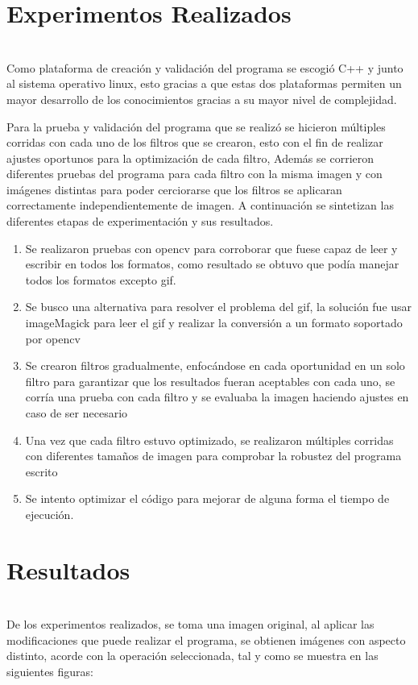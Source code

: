 \documentclass[11pt]{article}
\begin{document}
\section{Experimentos Realizados}\\

    Como plataforma de creación y validación del programa se escogió C++ y junto al sistema operativo linux, esto gracias a que estas dos plataformas permiten un mayor desarrollo de los conocimientos gracias a su mayor nivel de complejidad.
    
	Para la prueba y validación del programa que se realizó se hicieron múltiples corridas con cada uno de los filtros que se crearon, esto con el fin de realizar ajustes oportunos para la optimización de cada filtro, Además se corrieron diferentes pruebas del programa para cada filtro con la misma imagen y con imágenes distintas para poder cerciorarse que los filtros se aplicaran correctamente independientemente de imagen.
	A continuación se sintetizan las diferentes etapas de experimentación y sus resultados.
	\begin{enumerate}
	    \item Se realizaron pruebas con opencv para corroborar que fuese capaz de leer y escribir en todos los formatos, como resultado se obtuvo que podía manejar todos los formatos excepto gif.
		\item Se busco una alternativa para resolver el problema del gif, la solución fue usar imageMagick para leer el gif y realizar la conversión a un formato soportado por opencv
		\item Se crearon filtros gradualmente, enfocándose en cada oportunidad en un solo filtro para garantizar que los resultados fueran aceptables con cada uno, se corría una prueba con cada filtro y se evaluaba la imagen haciendo ajustes en caso de ser necesario
		\item Una vez que cada filtro estuvo optimizado, se realizaron múltiples corridas con diferentes tamaños de imagen para comprobar la robustez del programa escrito
		\item Se intento optimizar el código para mejorar de alguna forma el tiempo de ejecución.
	\end{enumerate} 

\newpage
\section{Resultados}\\

De los experimentos realizados, se toma una imagen original, al aplicar las modificaciones que puede realizar el programa, se obtienen imágenes con aspecto distinto, acorde con la operación seleccionada, tal y como se muestra en las siguientes figuras:
\end{document}
